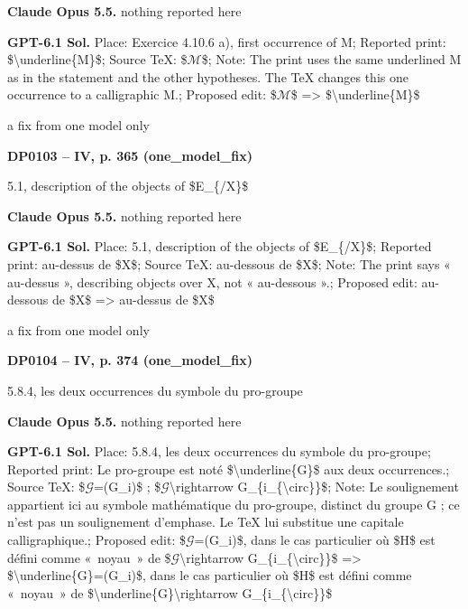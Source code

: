 \textbf{Claude Opus 5.5.} nothing reported here\par
\textbf{GPT-6.1 Sol.} Place: Exercice 4.10.6 a), first occurrence of M; Reported print: \$\textbackslash{}underline\{M\}\$; Source TeX: \$\ensuremath{\mathcal{M}}\$; Note: The print uses the same underlined M as in the statement and the other hypotheses. The TeX changes this one occurrence to a calligraphic M.; Proposed edit: \$\ensuremath{\mathcal{M}}\$ =\allowbreak > \$\textbackslash{}underline\{M\}\$\par
a fix from one model only\par
\par\noindent\hypertarget{DP0103}{}\textbf{DP0103 -- IV, p. 365 (one\_model\_fix)}\par
5.1, description of the objects of \$E\_\{/X\}\$\par
\textbf{Claude Opus 5.5.} nothing reported here\par
\textbf{GPT-6.1 Sol.} Place: 5.1, description of the objects of \$E\_\{/X\}\$; Reported print: au-dessus de \$X\$; Source TeX: au-dessous de \$X\$; Note: The print says « au-dessus », describing objects over X, not « au-dessous ».; Proposed edit: au-dessous de \$X\$ =\allowbreak > au-dessus de \$X\$\par
a fix from one model only\par
\par\noindent\hypertarget{DP0104}{}\textbf{DP0104 -- IV, p. 374 (one\_model\_fix)}\par
5.8.4, les deux occurrences du symbole du pro-groupe\par
\textbf{Claude Opus 5.5.} nothing reported here\par
\textbf{GPT-6.1 Sol.} Place: 5.8.4, les deux occurrences du symbole du pro-groupe; Reported print: Le pro-groupe est noté \$\textbackslash{}underline\{G\}\$ aux deux occurrences.; Source TeX: \$\ensuremath{𝒢}=\allowbreak (G\_i)\$ ; \$\ensuremath{𝒢}\textbackslash{}rightarrow G\_\{i\_\{\textbackslash{}circ\}\}\$; Note: Le soulignement appartient ici au symbole mathématique du pro-groupe, distinct du groupe G ; ce n'est pas un soulignement d'emphase. Le TeX lui substitue une capitale calligraphique.; Proposed edit: \$\ensuremath{𝒢}=\allowbreak (G\_i)\$, dans le cas particulier où \$H\$ est défini comme «~noyau~»  de \$\ensuremath{𝒢}\textbackslash{}rightarrow G\_\{i\_\{\textbackslash{}circ\}\}\$ =\allowbreak > \$\textbackslash{}underline\{G\}=\allowbreak (G\_i)\$, dans le cas particulier où \$H\$ est défini comme «~noyau~»  de \$\textbackslash{}underline\{G\}\textbackslash{}rightarrow G\_\{i\_\{\textbackslash{}circ\}\}\$\par
